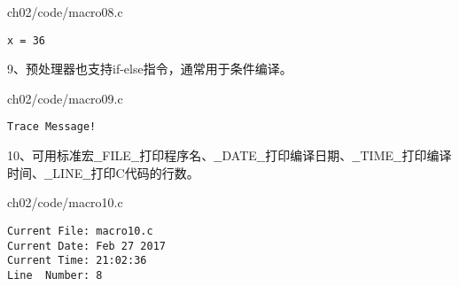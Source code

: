 \begin{frame}[fragile]\ft{\secname}
{ch02/code/macro08.c}
\pause 
\begin{lstlisting}[backgroundcolor=\color{red!10}]
x = 36
\end{lstlisting}
\end{frame}

\begin{frame}[fragile]\ft{\secname}
9、预处理器也支持if-else指令，通常用于条件编译。
\end{frame}

\begin{frame}[fragile]\ft{\secname}

{ch02/code/macro09.c}
\pause 
\begin{lstlisting}[backgroundcolor=\color{red!10}]
Trace Message!
\end{lstlisting}
\end{frame}

\begin{frame}[fragile]\ft{\secname}
10、可用标准宏{\tf $\_\_$FILE$\_\_$}打印程序名、{\tf $\_\_$DATE$\_\_$}打印编译日期、{\tf$\_\_$TIME$\_\_$}打印编译时间、{\tf $\_\_$LINE$\_\_$}打印C代码的行数。
\end{frame}

\begin{frame}[fragile]\ft{\secname}
{ch02/code/macro10.c}
\end{frame}

\begin{frame}[fragile]\ft{\secname} 
\begin{lstlisting}[backgroundcolor=\color{red!10}]
Current File: macro10.c
Current Date: Feb 27 2017
Current Time: 21:02:36
Line  Number: 8 
\end{lstlisting}
\end{frame}
